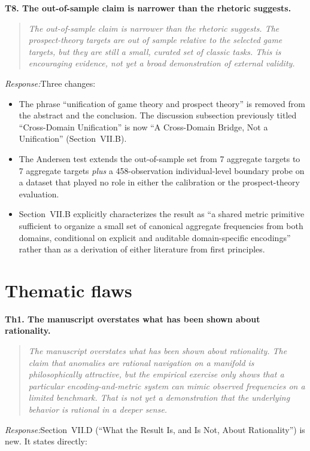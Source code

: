 \documentclass[11pt]{article}
\newcommand{\rev}[1]{\textbf{#1}}
\newcommand{\resp}{\medskip\noindent\emph{Response:}\quad}
\begin{document}
\rev{T8. The out-of-sample claim is narrower than the rhetoric suggests.}
\begin{quote}\itshape\small
The out-of-sample claim is narrower than the rhetoric suggests. The prospect-theory targets are out of sample relative to the selected game targets, but they are still a small, curated set of classic tasks. This is encouraging evidence, not yet a broad demonstration of external validity.
\end{quote}
\resp Three changes:
\begin{itemize}[leftmargin=*]
  \item The phrase ``unification of game theory and prospect theory'' is removed from the
        abstract and the conclusion. The discussion subsection previously titled ``Cross-Domain
        Unification'' is now ``A Cross-Domain Bridge, Not a Unification'' (Section~VII.B).
  \item The Andersen test extends the out-of-sample set from 7 aggregate targets to
        7 aggregate targets \emph{plus} a 458-observation individual-level boundary probe
        on a dataset that played no role in either the calibration or the prospect-theory
        evaluation.
  \item Section~VII.B explicitly characterizes the result as ``a shared metric primitive
        sufficient to organize a small set of canonical aggregate frequencies from both
        domains, conditional on explicit and auditable domain-specific encodings'' rather
        than as a derivation of either literature from first principles.
\end{itemize}

\section*{Thematic flaws}

\rev{Th1. The manuscript overstates what has been shown about rationality.}
\begin{quote}\itshape\small
The manuscript overstates what has been shown about rationality. The claim that anomalies are rational navigation on a manifold is philosophically attractive, but the empirical exercise only shows that a particular encoding-and-metric system can mimic observed frequencies on a limited benchmark. That is not yet a demonstration that the underlying behavior is rational in a deeper sense.
\end{quote}
\resp Section~VII.D (``What the Result Is, and Is Not, About Rationality'') is new. It
states directly:
\end{document}
